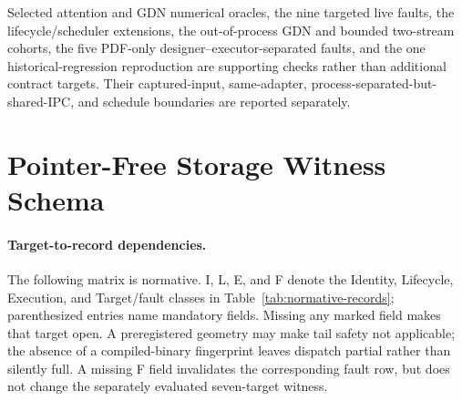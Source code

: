 \documentclass{article}
\begin{document}
Selected attention and GDN numerical oracles, the nine targeted live faults,
the lifecycle/scheduler extensions, the out-of-process GDN and bounded
two-stream cohorts, the five PDF-only designer--executor-separated faults, and
the one historical-regression reproduction are supporting
checks rather than additional contract
targets.  Their captured-input, same-adapter, process-separated-but-shared-IPC,
and schedule boundaries are reported separately.

\section{Pointer-Free Storage Witness Schema}
\label{app:storage-schema}

\paragraph{Target-to-record dependencies.}
The following matrix is normative.  I, L, E, and F denote the Identity,
Lifecycle, Execution, and Target/fault classes in Table~\ref{tab:normative-records};
parenthesized entries name mandatory fields.  Missing any marked field makes
that target open.  A preregistered geometry may make tail safety not applicable;
the absence of a compiled-binary fingerprint leaves dispatch partial rather
than silently full.  A missing F field invalidates the corresponding fault row,
but does not change the separately evaluated seven-target witness.
\end{document}
